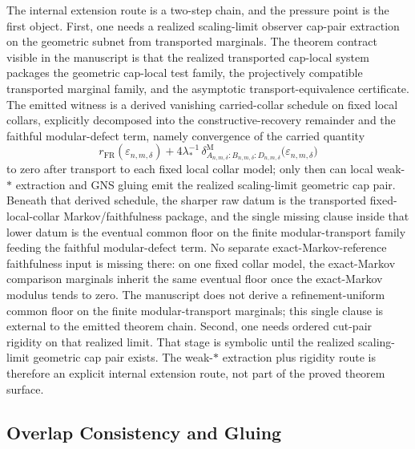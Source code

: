 The internal extension route is a two-step chain, and the pressure point is the first object. First, one needs a realized scaling-limit observer cap-pair extraction on the geometric subnet from transported marginals. The theorem contract visible in the manuscript is that the realized transported cap-local system packages the geometric cap-local test family, the projectively compatible transported marginal family, and the asymptotic transport-equivalence certificate. The emitted witness is a derived vanishing carried-collar schedule on fixed local collars, explicitly decomposed into the constructive-recovery remainder and the faithful modular-defect term, namely convergence of the carried quantity
\[
r_{\mathrm{FR}}(\varepsilon_{n,m,\delta})
+
4\lambda_\ast^{-1}\,
\delta^{\mathrm M}_{A_{n,m,\delta}:B_{n,m,\delta}:D_{n,m,\delta}}
\bigl(\varepsilon_{n,m,\delta}\bigr)
\]
to zero after transport to each fixed local collar model; only then can local weak-\(*\) extraction and GNS gluing emit the realized scaling-limit geometric cap pair. Beneath that derived schedule, the sharper raw datum is the transported fixed-local-collar Markov/faithfulness package, and the single missing clause inside that lower datum is the eventual common floor on the finite modular-transport family feeding the faithful modular-defect term. No separate exact-Markov-reference faithfulness input is missing there: on one fixed collar model, the exact-Markov comparison marginals inherit the same eventual floor once the exact-Markov modulus tends to zero. The manuscript does not derive a refinement-uniform common floor on the finite modular-transport marginals; this single clause is external to the emitted theorem chain. Second, one needs ordered cut-pair rigidity on that realized limit. That stage is symbolic until the realized scaling-limit geometric cap pair exists. The weak-\(*\) extraction plus rigidity route is therefore an explicit internal extension route, not part of the proved theorem surface.
\subsection{Overlap Consistency and Gluing}\label{3-overlap-consistency-and-gluing}

